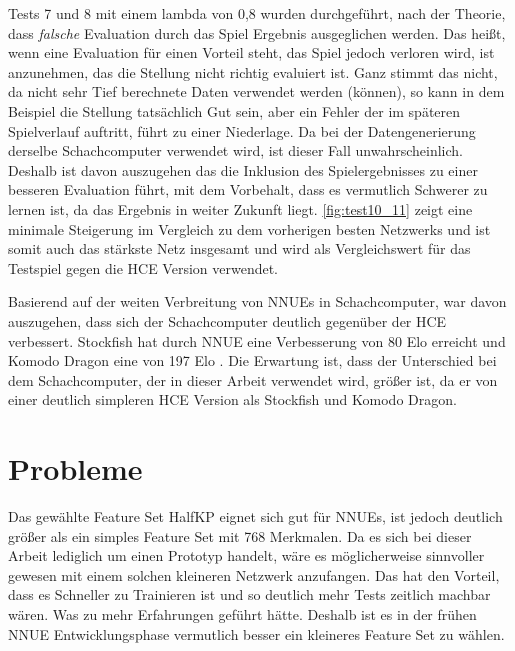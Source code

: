 Tests 7 und 8 mit einem lambda von 0,8 wurden durchgeführt, nach der Theorie, dass \emph{falsche} Evaluation durch das Spiel Ergebnis ausgeglichen werden. Das heißt, wenn eine Evaluation für einen Vorteil steht, das Spiel jedoch verloren wird, ist anzunehmen, das die Stellung nicht richtig evaluiert ist. Ganz stimmt das nicht, da nicht sehr Tief berechnete Daten verwendet werden (können), so kann in dem Beispiel die Stellung tatsächlich Gut sein, aber ein Fehler der im späteren Spielverlauf auftritt, führt zu einer Niederlage. Da bei der Datengenerierung derselbe Schachcomputer verwendet wird, ist dieser Fall unwahrscheinlich. Deshalb ist davon auszugehen das die Inklusion des Spielergebnisses zu einer besseren Evaluation führt, mit dem Vorbehalt, dass es vermutlich Schwerer zu lernen ist, da das Ergebnis in weiter Zukunft liegt. \autoref{fig:test10_11} zeigt eine minimale Steigerung im Vergleich zu dem vorherigen besten Netzwerks und ist somit auch das stärkste Netz insgesamt und wird als Vergleichswert für das Testspiel gegen die \ac{HCE} Version verwendet.

Basierend auf der weiten Verbreitung von \acp{NNUE} in Schachcomputer, war davon auszugehen, dass sich der Schachcomputer deutlich gegenüber der \ac{HCE} verbessert. Stockfish hat durch \ac{NNUE} eine Verbesserung von 80 Elo erreicht und Komodo Dragon eine von 197 Elo \cite{StockfishIntroducingNNUE, KomodoDragon}. Die Erwartung ist, dass der Unterschied bei dem Schachcomputer, der in dieser Arbeit verwendet wird, größer ist, da er von einer deutlich simpleren \ac{HCE} Version als Stockfish und Komodo Dragon.

\section{Probleme}

Das gewählte Feature Set HalfKP eignet sich gut für \acp{NNUE}, ist jedoch deutlich größer als ein simples Feature Set mit 768 Merkmalen. Da es sich bei dieser Arbeit lediglich um einen Prototyp handelt, wäre es möglicherweise sinnvoller gewesen mit einem solchen kleineren Netzwerk anzufangen. Das hat den Vorteil, dass es Schneller zu Trainieren ist und so deutlich mehr Tests zeitlich machbar wären. Was zu mehr Erfahrungen geführt hätte. Deshalb ist es in der frühen \ac{NNUE} Entwicklungsphase vermutlich besser ein kleineres Feature Set zu wählen.

